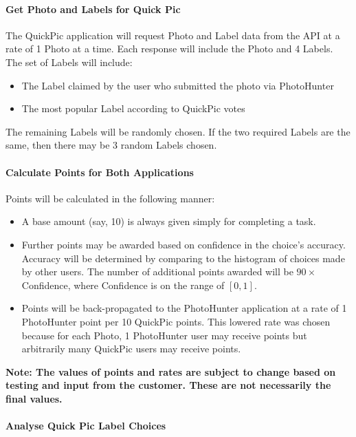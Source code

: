 \documentclass{article}
\begin{document}
\paragraph{Get Photo and Labels for Quick Pic}

The QuickPic application will request Photo and Label data from the API at a
rate of 1 Photo at a time.  Each response will include the Photo and 4 Labels.
The set of Labels will include:

\begin{itemize}
  \item The Label claimed by the user who submitted the photo via PhotoHunter
  \item The most popular Label according to QuickPic votes
\end{itemize}

The remaining Labels will be randomly chosen.  If the two required Labels are
the same, then there may be 3 random Labels chosen.

\paragraph{Calculate Points for Both Applications}

Points will be calculated in the following manner:

\begin{itemize}
  \item A base amount (say, 10) is always given simply for completing a task.
  \item Further points may be awarded based on confidence in the choice's
    accuracy.  Accuracy will be determined by comparing to the histogram of
    choices made by other users.  The number of additional points awarded will
    be $90 \times$ Confidence, where Confidence is on the range of
    $[0, 1]$.

  \item Points will be back-propagated to the PhotoHunter application at a rate
    of 1 PhotoHunter point per 10 QuickPic points.  This lowered rate was
    chosen because for each Photo, 1 PhotoHunter user may receive points but
    arbitrarily many QuickPic users may receive points.
\end{itemize}

\textbf{Note: The values of points and rates are subject to change based on
  testing and input from the customer.  These are not necessarily the final
values.}

\paragraph{Analyse Quick Pic Label Choices}
\end{document}
